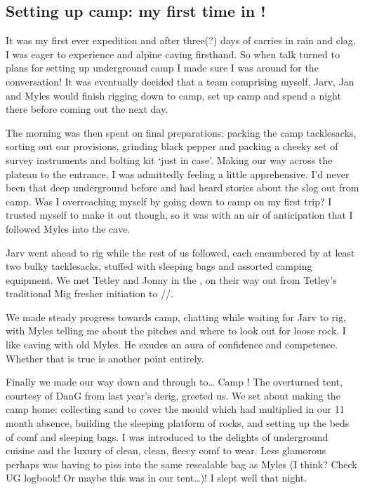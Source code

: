 \subsection{\texorpdfstring{Setting up camp: my first time in
!}{Setting up camp: my first time in Vrtnarija!}}

It was my first ever expedition and after three(?) days of carries in
rain and clag, I was eager to experience  and alpine
caving firsthand. So when talk turned to plans for setting up
underground camp I made sure I was around for the conversation! It was
eventually decided that a team comprising myself, Jarv, Jan and Myles
would finish rigging down to camp, set up camp and spend a night there
before coming out the next day.

The morning was then spent on final preparations: packing the camp
tacklesacks, sorting out our provisions, grinding black pepper and
packing a cheeky set of survey instruments and bolting kit `just in
case'. Making our way across the plateau to the entrance, I was
admittedly feeling a little apprehensive. I'd never been that deep
underground before and had heard stories about the slog out from camp.
Was I overreaching myself by going down to camp on my first trip? I
trusted myself to make it out though, so it was with an air of
anticipation that I followed Myles into the cave.

Jarv went ahead to rig while the rest of us followed, each encumbered by
at least two bulky tacklesacks, stuffed with sleeping bags and assorted
camping equipment. We met Tetley and Jonny in the ,
on their way out from Tetley's traditional Mig fresher initiation to
//.

We made steady progress towards camp, chatting while waiting for Jarv to
rig, with Myles telling me about the pitches and where to look out for
loose rock. I like caving with old Myles. He exudes an aura of
confidence and competence. Whether that is true is another point
entirely.

Finally we made our way down  and through  to\ldots{} Camp ! The overturned tent, courtesy of
DanG from last year's derig, greeted us. We set about making the camp
home: collecting sand to cover the mould which had multiplied in our 11
month absence, building the sleeping platform of rocks, and setting up
the beds of comf and sleeping bags. I was introduced to the delights of
underground cuisine and the luxury of clean, clean, fleecy comf to wear.
Less glamorous perhaps was having to piss into the same resealable bag
as Myles (I think? Check UG logbook! Or maybe this was in our
tent\ldots{})! I slept well that night.

